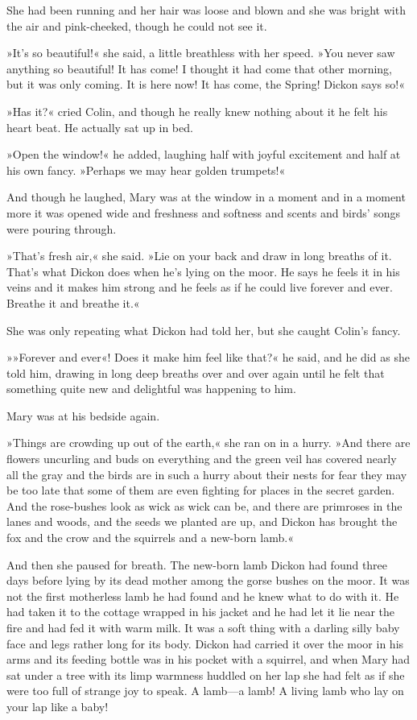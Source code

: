 She had been running and her hair was loose and blown and she was bright with the air and pink-cheeked, though he could not see it.

»It's so beautiful!« she said, a little breathless with her speed. »You never saw anything so beautiful! It has come! I thought it had come that other morning, but it was only coming. It is here now! It has come, the Spring! Dickon says so!«

»Has it?« cried Colin, and though he really knew nothing about it he felt his heart beat. He actually sat up in bed.

»Open the window!« he added, laughing half with joyful excitement and half at his own fancy. »Perhaps we may hear golden trumpets!«

And though he laughed, Mary was at the window in a moment and in a moment more it was opened wide and freshness and softness and scents and birds' songs were pouring through.

»That's fresh air,« she said. »Lie on your back and draw in long breaths of it. That's what Dickon does when he's lying on the moor. He says he feels it in his veins and it makes him strong and he feels as if he could live forever and ever. Breathe it and breathe it.«

She was only repeating what Dickon had told her, but she caught Colin's fancy.

»»Forever and ever«! Does it make him feel like that?« he said, and he did as she told him, drawing in long deep breaths over and over again until he felt that something quite new and delightful was happening to him.

Mary was at his bedside again.

»Things are crowding up out of the earth,« she ran on in a hurry. »And there are flowers uncurling and buds on everything and the green veil has covered nearly all the gray and the birds are in such a hurry about their nests for fear they may be too late that some of them are even fighting for places in the secret garden. And the rose-bushes look as wick as wick can be, and there are primroses in the lanes and woods, and the seeds we planted are up, and Dickon has brought the fox and the crow and the squirrels and a new-born lamb.«

And then she paused for breath. The new-born lamb Dickon had found three days before lying by its dead mother among the gorse bushes on the moor. It was not the first motherless lamb he had found and he knew what to do with it. He had taken it to the cottage wrapped in his jacket and he had let it lie near the fire and had fed it with warm milk. It was a soft thing with a darling silly baby face and legs rather long for its body. Dickon had carried it over the moor in his arms and its feeding bottle was in his pocket with a squirrel, and when Mary had sat under a tree with its limp warmness huddled on her lap she had felt as if she were too full of strange joy to speak. A lamb—a lamb! A living lamb who lay on your lap like a baby!


